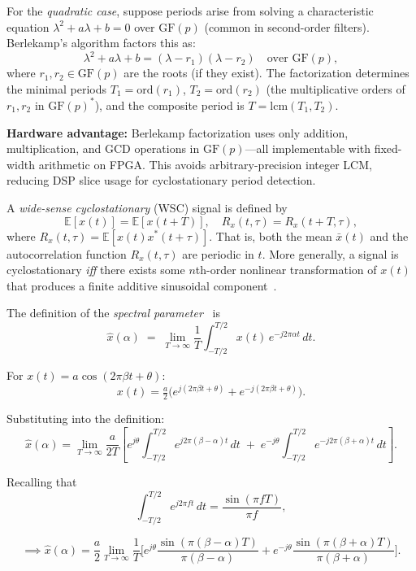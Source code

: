 For the \emph{quadratic case}, suppose periods arise from solving a characteristic equation $\lambda^2 + a\lambda + b = 0$ over $\mathrm{GF}(p)$ (common in second-order filters). Berlekamp's algorithm factors this as:
\[
\lambda^2 + a\lambda + b = (\lambda - r_1)(\lambda - r_2) \quad \text{over } \mathrm{GF}(p),
\]
where $r_1, r_2 \in \mathrm{GF}(p)$ are the roots (if they exist). The factorization determines the minimal periods $T_1 = \text{ord}(r_1)$, $T_2 = \text{ord}(r_2)$ (the multiplicative orders of $r_1, r_2$ in $\mathrm{GF}(p)^*$), and the composite period is $T = \mathrm{lcm}(T_1, T_2)$.

\noindent\textbf{Hardware advantage:} Berlekamp factorization uses only addition, multiplication, and GCD operations in $\mathrm{GF}(p)$—all implementable with fixed-width arithmetic on FPGA. This avoids arbitrary-precision integer LCM, reducing DSP slice usage for cyclostationary period detection.

\medskip
\noindent A \textit{wide-sense cyclostationary} (WSC) signal is defined by
\[
\mathbb{E}[x(t)] = \mathbb{E}[x(t+T)], \quad R_x(t,\tau) = R_x(t+T,\tau),
\]
where $R_x(t,\tau) = \mathbb{E}[x(t)x^*(t+\tau)]$.
That is, both the mean $\bar{x}(t)$ and the autocorrelation function $R_x(t,\tau)$ are periodic in $t$.
More generally, a signal is cyclostationary \textit{iff} there exists some $n$th-order nonlinear transformation of $x(t)$ that produces a finite additive sinusoidal component~\cite{}.
\medskip

\noindent The definition of the \textit{spectral parameter}~\cite{} is
\[
\hat{x}(\alpha) \;=\; \lim_{T \to \infty} \frac{1}{T}
\int_{-T/2}^{T/2} x(t)\,e^{-j2\pi \alpha t}\,dt.
\]

For $x(t) = a\cos(2\pi \beta t + \theta)$:
\[
x(t) = \tfrac{a}{2}\big(e^{j(2\pi \beta t + \theta)} + e^{-j(2\pi \beta t + \theta)}\big).
\]

Substituting into the definition:
\[
\hat{x}(\alpha) = \lim_{T \to \infty} \frac{a}{2T}
\left[
e^{j\theta}\int_{-T/2}^{T/2} e^{j2\pi(\beta-\alpha)t}\,dt \;+\;
e^{-j\theta}\int_{-T/2}^{T/2} e^{-j2\pi(\beta+\alpha)t}\,dt
\right].
\]

Recalling that
\[
\int_{-T/2}^{T/2} e^{j2\pi f t}\,dt = \frac{\sin(\pi f T)}{\pi f},
\]

\[
\implies \hat{x}(\alpha) = \frac{a}{2} \lim_{T \to \infty} \frac{1}{T}\Bigg[
e^{j\theta}\frac{\sin(\pi(\beta-\alpha)T)}{\pi(\beta-\alpha)}
+ e^{-j\theta}\frac{\sin(\pi(\beta+\alpha)T)}{\pi(\beta+\alpha)}
\Bigg].
\]

